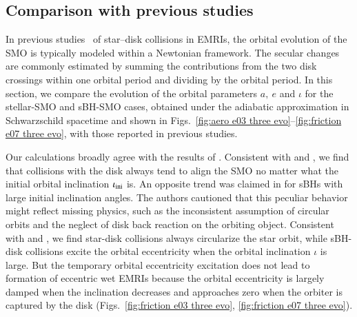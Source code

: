 \documentclass[aps,prx,reprint,superscriptaddress,nofootinbib,longbibliography]{revtex4-1}
\begin{document}
\subsection{Comparison with previous studies}\label{sec:comparison}
In previous studies~\cite{spieksma2025gripdiskdraggingcompanion,Wang2024,Rowan_2025,10.1093/mnras/staa3004,10.1093/mnras/stad1295,Secunda_2021,MacLeod:2019jxd,OConnor2020} of star–disk collisions in EMRIs, the orbital evolution of the SMO is typically modeled within a Newtonian framework. The secular changes are commonly estimated by summing the contributions from the two disk crossings within one orbital period and dividing by the orbital period. In this section, we compare the evolution of the orbital parameters $a,\ e$ and $\iota$ for the stellar-SMO and sBH-SMO cases, obtained under the adiabatic approximation in Schwarzschild spacetime and shown in Figs.~\ref{fig:aero e03 three evo}–\ref{fig:friction e07 three evo}, with those reported in previous studies.\par

Our calculations broadly agree with the results of \cite{Wang2024}.
Consistent with \cite{spieksma2025gripdiskdraggingcompanion} and \cite{Wang2024}, we find that collisions with the disk always tend to align the SMO no matter what the initial orbital inclination $\iota_{\rm ini}$ is.
An opposite trend was claimed in \cite{10.1093/mnras/stad1295} for sBHs with large initial inclination angles. 
The authors cautioned that this peculiar behavior might reflect missing physics, such as the inconsistent assumption of circular orbits and the neglect of disk back reaction on the orbiting object.
Consistent with \cite{spieksma2025gripdiskdraggingcompanion} and \cite{Wang2024} , we find star-disk collisions always circularize the star orbit, while sBH-disk collisions excite the orbital eccentricity when the orbital inclination $\iota$ is large. But the temporary orbital eccentricity excitation does not lead to formation of eccentric wet EMRIs because the orbital eccentricity is largely damped when the inclination decreases and approaches zero when the orbiter is captured by the disk (Figs.~\ref{fig:friction e03 three evo}, \ref{fig:friction e07 three evo}). 
\end{document}
